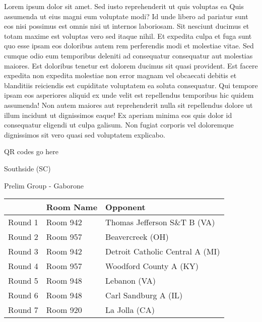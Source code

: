 \documentclass{article}%
\begin{document}
\vspace*{8pt}%
\linebreak%
\newline%
\newline%
Lorem ipsum dolor sit amet. Sed iusto reprehenderit ut quis voluptas ea Quis assumenda ut eius magni eum voluptate modi? Id unde libero ad pariatur sunt eos nisi possimus est omnis nisi ut internos laboriosam. Sit nesciunt ducimus et totam maxime est voluptas vero sed itaque nihil. Et expedita culpa et fuga sunt quo esse ipsam eos doloribus autem rem perferendis modi et molestiae vitae.\newline%
\newline%
Sed cumque odio eum temporibus deleniti ad consequatur consequatur aut molestias maiores. Est doloribus tenetur est dolorem ducimus sit quasi provident. Est facere expedita non expedita molestiae non error magnam vel obcaecati debitis et blanditiis reiciendis est cupiditate voluptatem ea soluta consequatur. Qui tempore ipsam eos asperiores aliquid ex unde velit est repellendus temporibus hic quidem assumenda!\newline%
\newline%
Non autem maiores aut reprehenderit nulla sit repellendus dolore ut illum incidunt ut dignissimos eaque! Ex aperiam minima eos quis dolor id consequatur eligendi ut culpa galisum. Non fugiat corporis vel doloremque dignissimos sit vero quasi sed voluptatem explicabo.\newline%
\newline%
%
\vspace*{30pt}%
\begin{center}%
\begin{Huge}%
QR codes go here%
\end{Huge}%
\end{center}%
\newpage%
%
\begin{center}%
\begin{Huge}%
Southside (SC)%
\end{Huge}%
\vspace*{8pt}%
\linebreak%
\begin{Large}%
Prelim Group {-} Gaborone%
\end{Large}%
\end{center}%
\begin{tabularx}{\textwidth}{|c|Y|Y|}%
\hline%
&Room Name&Opponent\\%
\hline%
Round 1&Room 942&Thomas Jefferson S\&T B (VA)\\%
Round 2&Room 957&Beavercreek (OH)\\%
Round 3&Room 942&Detroit Catholic Central A (MI)\\%
Round 4&Room 957&Woodford County A (KY)\\%
Round 5&Room 948&Lebanon (VA)\\%
Round 6&Room 948&Carl Sandburg A (IL)\\%
Round 7&Room 920&La Jolla (CA)\\%
\hline%
\end{tabularx}%
\end{document}
